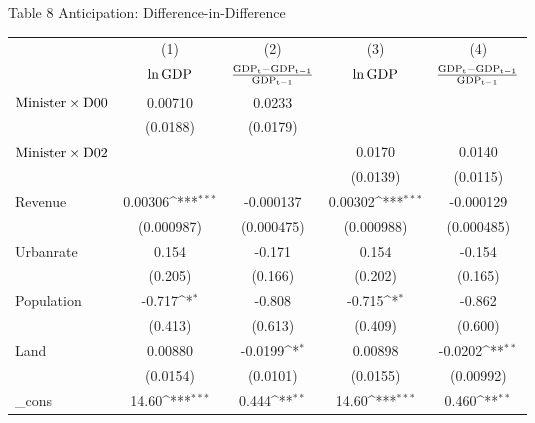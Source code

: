 \documentclass[11pt,a4paper]{article}
\begin{document}
\newpage

\begin{center}
Table 8 Anticipation: Difference-in-Difference\\

\medskip
\begin{scriptsize}
{
\def\sym#1{\ifmmode^{#1}\else\(^{#1}\)\fi}
\begin{tabular}{l*{4}{c}}
\hline\hline
            &\multicolumn{1}{c}{(1)}&\multicolumn{1}{c}{(2)}&\multicolumn{1}{c}{(3)}&\multicolumn{1}{c}{(4)}\\
            &\multicolumn{1}{c}{\(\rm \ln GDP\)}&\multicolumn{1}{c}{$\rm \frac{ GDP_{t}-GDP_{t-1}}{GDP_{t-1}}$}&\multicolumn{1}{c}{\(\rm \ln GDP\)}&\multicolumn{1}{c}{$\rm \frac{ GDP_{t}-GDP_{t-1}}{GDP_{t-1}}$}\\
\hline
${\rm Minister \times D00}$      &     0.00710         &  0.0233        &           &                     \\
            &    (0.0188)         &      (0.0179)    &          &                     \\
[1em]
${\rm Minister \times D02}$       &                     &      &      0.0170            &      0.0140         \\
            &                     &    &         (0.0139)      &    (0.0115)         \\
[1em]
Revenue  &     0.00306\sym{***}&   -0.000137         &     0.00302\sym{***}&   -0.000129         \\
            &  (0.000987)         &  (0.000475)         &  (0.000988)         &  (0.000485)         \\
[1em]
Urbanrate   &       0.154         &      -0.171         &       0.154         &      -0.154         \\
            &     (0.205)         &     (0.166)         &     (0.202)         &     (0.165)         \\
[1em]
Population      &      -0.717\sym{*}  &      -0.808         &      -0.715\sym{*}  &      -0.862         \\
            &     (0.413)         &     (0.613)         &     (0.409)         &     (0.600)         \\
[1em]
Land      &     0.00880         &     -0.0199\sym{*}  &     0.00898         &     -0.0202\sym{**} \\
            &    (0.0154)         &    (0.0101)         &    (0.0155)         &   (0.00992)         \\
[1em]
\_cons      &       14.60\sym{***}&       0.444\sym{**} &       14.60\sym{***}&       0.460\sym{**} \\

\end{tabular}}
\end{scriptsize}
\end{center}
\end{document}

